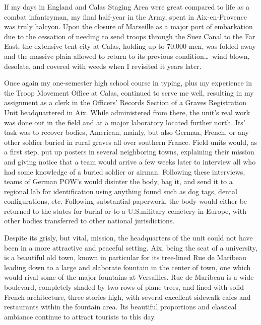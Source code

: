 \documentclass[../m3y]{subfiles}
\begin{document}
If my days in England and Calas Staging Area were great compared to life as a combat infantryman, my final half-year in the Army, spent in Aix-en-Provence was truly halcyon. Upon the closure of Marseille as a major port of embarkation due to the cessation of needing to send troops through the Suez Canal to the Far East, the extensive tent city at Calas, holding up to 70,000 men, was folded away and the massive plain allowed to return to its previous condition\ldots\ wind blown, desolate, and covered with weeds when I revisited it years later.

Once again my one-semester high school course in typing, plus my experience in the Troop Movement Office at Calas, continued to serve me well, resulting in my assignment as a clerk in the Officers' Records Section of a Graves Registration Unit headquartered in Aix. While administered from there, the unit's real work was done out in the field and at a major laboratory located further north. Its' task was to recover bodies, American, mainly, but also German, French, or any other soldier buried in rural graves all over southern France. Field units would, as a first step, put up posters in several neighboring towns, explaining their mission and giving notice that a team would arrive a few weeks later to interview all who had some knowledge of a buried soldier or airman. Following these interviews, teams of German POW's would disinter the body, bag it, and send it to a regional lab for identification using anything found such as dog tags, dental configurations, etc. Following substantial paperwork, the body would either be returned to the states for burial or to a U.S.\@ military cemetery in Europe, with other bodies transferred to other national jurisdictions.

Despite its grisly, but vital, mission, the headquarters of the unit could not have been in a more attractive and peaceful setting. Aix, being the seat of a university, is a beautiful old town, known in particular for its tree-lined Rue de Maribeau leading down to a large and elaborate fountain in the center of town, one which would rival some of the major fountains at Versailles. Rue de Maribeau is a wide boulevard, completely shaded by two rows of plane trees, and lined with solid French architecture, three stories high, with several excellent sidewalk cafes and restaurants within the fountain area. Its beautiful proportions and classical ambiance continue to attract tourists to this day.
\end{document}
